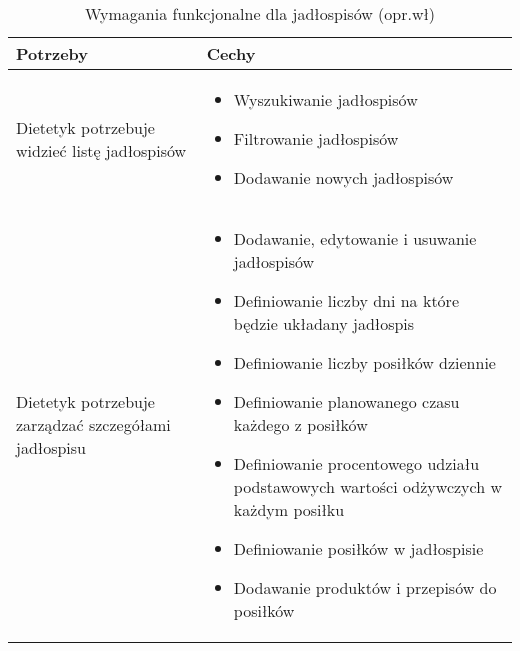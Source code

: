 \begin{minipage}{\textwidth}
    \begin{table}[H]
        \centering\caption{Wymagania funkcjonalne dla jadłospisów (opr.wł)\label{tabela:wymaganiaFunkcjonalneJadlospisy}}
        \begin{tabular}{|P{.3\textwidth}|P{.6\textwidth}|}
            \hline
            Potrzeby & Cechy \\

            \hline
            Dietetyk potrzebuje widzieć listę jadłospisów &
            \begin{itemize}
                \item Wyszukiwanie jadłospisów
                \item Filtrowanie jadłospisów
                \item Dodawanie nowych jadłospisów
            \end{itemize} \\
            \hline
            Dietetyk potrzebuje zarządzać szczegółami jadłospisu &
            \begin{itemize}
                \item Dodawanie, edytowanie i usuwanie jadłospisów
                \item Definiowanie liczby dni na które będzie układany jadłospis
                \item Definiowanie liczby posiłków dziennie
                \item Definiowanie planowanego czasu każdego z posiłków
                \item Definiowanie procentowego udziału podstawowych wartości odżywczych w każdym posiłku
                \item Definiowanie posiłków w jadłospisie
                \item Dodawanie produktów i przepisów do posiłków
            \end{itemize} \\
            \hline
        \end{tabular}
    \end{table}
\end{minipage}

